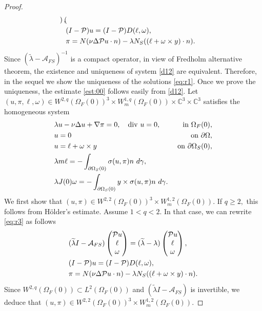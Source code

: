 \documentclass[12pt,a4paper,reqno]{amsart}
\theoremstyle{definition}
\theoremstyle{remark}
\numberwithin{equation}{section}
\newcommand{\oso}{\Omega_{S}(0)}
\newcommand{\ofo}{\Omega_{F}(0)}
\newcommand{\ct}{\mathbb{C}^{3}}
\newcommand{\ds}{\displaystyle}
\newcommand{\poso}{\partial\oso}
\newcommand{\mpp}{\mathcal{P}}
\begin{document}
\begin{proof}
\begin{align}
\begin{pmatrix}
\end{pmatrix}, \notag \\
&(I - \mpp) u = (I - \mpp) D (\ell,\omega ),  \\
&\pi = N (\nu \Delta \mpp u \cdot n) - \lambda N_{S} ((\ell + \omega \times y) \cdot n). \notag
\end{align}
Since $\ds \left(\widetilde\lambda - \mathcal{A}_{FS} \right)^{-1}$ is a compact operator, in view of Fredholm alternative theorem, the existence and uniqueness of system \eqref{d12} are equivalent. Therefore, in the sequel we show the uniqueness of the solutions \eqref{eq:r1}. Once we prove the uniqueness, the estimate \eqref{est:00} follows easily from \eqref{d12}. Let $(u, \pi, \ell, \omega) \in W^{2,q}(\ofo)^{3} \times W^{1,q}_{m}(\ofo) \times \ct \times \ct$ satisfies the homogeneous system
\begin{alignat}{2} \label{eq:r3}
&\lambda u - \nu \Delta u + \nabla \pi  = 0, \quad \mathrm{div} \ u = 0,  &  \mbox{ in }   \ofo, \notag \\
& u = 0   & \mbox{ on }  \partial\Omega,\notag  \\
&  u  = \ell  + \omega \times y &   \mbox{ on }    \poso, \notag \\
&   \lambda  m \ell =  -  \int_{\partial \Omega_{S}(0)}  \sigma(u,\pi) n \ d\gamma , \\
&  \lambda J(0) \omega =  - \int_{\partial \Omega_{S}(0)} y \times   \sigma(u,\pi)n \ d\gamma.\notag
\end{alignat}
We first show that $(u,\pi) \in W^{2,2}(\ofo)^{3} \times W_{m}^{1,2}(\ofo).$ If $q\geqslant 2,$ this follows from  H\"older's estimate.  Assume $1 < q <2.$ In that case, we can rewrite \eqref{eq:r3} as follows
\begin{align} \label{d14}
&(\widetilde\lambda I - \mathcal{A}_{FS}) \begin{pmatrix}
\mpp u \\ \ell \\ \omega
\end{pmatrix} = (\widetilde \lambda - \lambda) \begin{pmatrix}
\mpp u \\ \ell \\ \omega
\end{pmatrix}, \notag \\
&(I - \mpp) u = (I - \mpp) D (\ell,\omega ),  \\
&\pi = N (\nu \Delta \mpp u \cdot n) - \lambda N_{S} ((\ell + \omega \times y) \cdot n). \notag
\end{align}
Since $W^{2,q}(\ofo) \subset L^{2}(\ofo)$ and $(\widetilde\lambda I - \mathcal{A}_{FS}) $ is invertible, we deduce that $(u,\pi) \in W^{2,2}(\ofo)^{3} \times W_{m}^{1,2}(\ofo).$


\end{proof}
\end{document}

